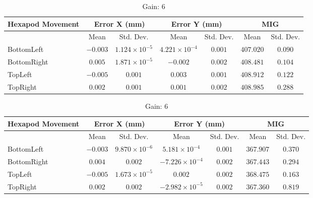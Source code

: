 \begin{table}[h]
    \vspace{10pt}

    \begin{subtable}{\textwidth}
        \centering
        \footnotesize
        \begin{tabular}{lcccccc}
            \toprule
            Hexapod Movement & \multicolumn{2}{c}{Error X (mm)} & \multicolumn{2}{c}{Error Y (mm)} & \multicolumn{2}{c}{MIG}  \\
            \midrule
            & \multicolumn{1}{c}{Mean} & \multicolumn{1}{c}{Std. Dev.} & \multicolumn{1}{c}{Mean} & \multicolumn{1}{c}{Std. Dev.} & \multicolumn{1}{c}{Mean} & \multicolumn{1}{c}{Std. Dev.} \\
            \midrule
            \textsf{BottomLeft} & $-0.003$ & $1.124\times10^{-5}$ & $4.221\times10^{-4}$ & $0.001$ & $407.020$ & $0.090$ \\
            \textsf{BottomRight} & $0.005$ & $1.871\times10^{-5}$ & $-0.002$ & $0.002$ & $408.481$ & $0.104$ \\
            \textsf{TopLeft} & $-0.005$ & $0.001$ & $0.003$ & $0.001$ & $408.912$ & $0.122$ \\
            \textsf{TopRight} & $0.002$ & $0.001$ & $0.001$ & $0.002$ & $408.985$ & $0.288$ \\
            \bottomrule
        \end{tabular}
        \caption{Gain: 4}
    \end{subtable}

    \vspace{10pt}

    \begin{subtable}{\textwidth}
        \centering
        \footnotesize
        \begin{tabular}{lcccccc}
            \toprule
            Hexapod Movement & \multicolumn{2}{c}{Error X (mm)} & \multicolumn{2}{c}{Error Y (mm)} & \multicolumn{2}{c}{MIG}  \\
            \midrule
            & \multicolumn{1}{c}{Mean} & \multicolumn{1}{c}{Std. Dev.} & \multicolumn{1}{c}{Mean} & \multicolumn{1}{c}{Std. Dev.} & \multicolumn{1}{c}{Mean} & \multicolumn{1}{c}{Std. Dev.} \\
            \midrule
            \textsf{BottomLeft} & $-0.003$ & $9.870\times10^{-6}$ & $5.181\times10^{-4}$ & $0.001$ & $367.907$ & $0.370$ \\
            \textsf{BottomRight} & $0.004$ & $0.002$ & $-7.226\times10^{-4}$ & $0.002$ & $367.443$ & $0.294$ \\
            \textsf{TopLeft} & $-0.005$ & $1.673\times10^{-5}$ & $0.002$ & $0.002$ & $368.475$ & $0.163$ \\
            \textsf{TopRight} & $0.002$ & $0.002$ & $-2.982\times10^{-5}$ & $0.002$ & $367.360$ & $0.819$ \\
            \bottomrule
        \end{tabular}
        \caption{Gain: 6}
    \end{subtable}


\end{table}
